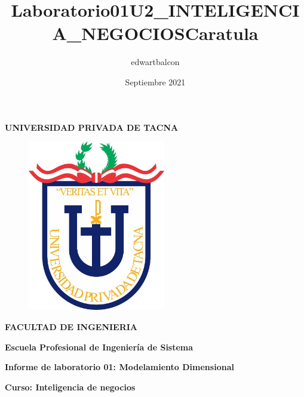\documentclass{article}
\title{Laboratorio01U2_INTELIGENCIA_NEGOCIOS}
\author{edwartbalcon}
\date{Septiembre 2021}
\begin{document}
\title{Caratula}

\begin{titlepage}
\begin{center}
\begin{Large}
\textbf{UNIVERSIDAD PRIVADA DE TACNA} \\
\end{Large}
\vspace*{-0.025in}
\begin{figure}[htb]
\begin{center}
\includegraphics[width=6cm]{./images/logo_UPT}
\end{center}
\end{figure}
\vspace*{-0.025in}
\begin{Large}
\textbf{FACULTAD DE INGENIERIA} \\
\end{Large}
\vspace*{0.05in}
\begin{Large}
\textbf{Escuela Profesional de Ingeniería de Sistema} \\
\end{Large}


\vspace*{0.4in}

\vspace*{0.1in}
\begin{Large}
\textbf{Informe de laboratorio 01: Modelamiento Dimensional} \\
\end{Large}

\vspace*{0.3in}
\begin{Large}
\textbf{Curso: Inteligencia de negocios} \\
\end{Large}


\end{center}
\end{titlepage}
\end{document}
